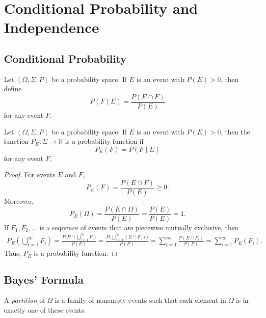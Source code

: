 \chapter{Conditional Probability and Independence}
\section{Conditional Probability}
\begin{definition}
  Let $(\Omega, \Sigma, P)$ be a probability space.
  If $E$ is an event with $P(E) > 0$, then define
  \begin{equation*}
    P(F \mid E) = \frac{P(E \cap F)}{P(E)}
  \end{equation*}
  for any event $F$.
\end{definition}

\begin{theorem}
  Let $(\Omega, \Sigma, P)$ be a probability space.
  If $E$ is an event with $P(E) > 0$, then the function
  $P_E: \Sigma \to \mathbb{R}$ is a probability function if
  \begin{equation*}
    P_E(F) = P(F \mid E)
  \end{equation*}
  for any event $F$.
\end{theorem}
\begin{proof}
  For events $E$ and $F$,
  \begin{equation*}
    P_E(F) = \frac{P(E \cap F)}{P(E)} \geq 0.
  \end{equation*}
  Moreover,
  \begin{equation*}
    P_E(\Omega) = \frac{P(E \cap \Omega)}{P(E)}
                = \frac{P(E)}{P(E)}
                = 1.
  \end{equation*}
  If $F_1, F_2, \dots$ is a sequence of events that are piecewise
  mutually exclusive, then
  \begin{align*}
    P_E\left(\bigcup_{i=1}^\infty F_i\right)
    = \frac{P\Big(E \cap \bigcup_{i=1}^\infty F_i\Big)}
           {P(E)}
    = \frac{P\Big(\bigcup_{i=1}^\infty (E \cap F_i)\Big)}
           {P(E)}
    = \sum_{i=1}^\infty \frac{P(E \cap F_i)}{P(E)}
    = \sum_{i=1}^\infty P_E(F_i).
  \end{align*}
  Thus, $P_E$ is a probability function.
\end{proof}

\section{Bayes' Formula}
\begin{definition}
  A \emph{partition} of $\Omega$ is a family of nonempty events such that
  each element in $\Omega$ is in exactly one of these events.
\end{definition}

